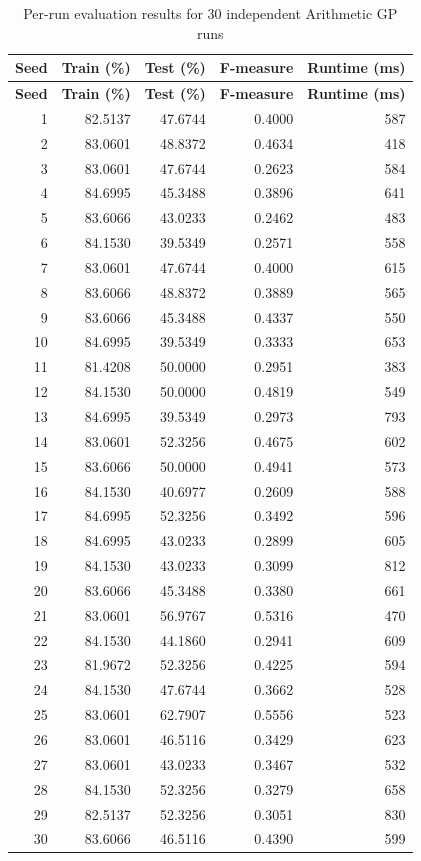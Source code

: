 \documentclass[12pt,a4paper]{article}
\begin{document}
\small
\begin{longtable}{rrrrr}
\caption{Per-run evaluation results for 30 independent Arithmetic GP runs}\label{tab:runresults}\\
\toprule
\textbf{Seed} & \textbf{Train (\%)} & \textbf{Test (\%)} & \textbf{F-measure} & \textbf{Runtime (ms)} \\
\midrule
\endfirsthead

\toprule
\textbf{Seed} & \textbf{Train (\%)} & \textbf{Test (\%)} & \textbf{F-measure} & \textbf{Runtime (ms)} \\
\midrule
\endhead

1  & 82.5137 & 47.6744 & 0.4000 & 587 \\
2  & 83.0601 & 48.8372 & 0.4634 & 418 \\
3  & 83.0601 & 47.6744 & 0.2623 & 584 \\
4  & 84.6995 & 45.3488 & 0.3896 & 641 \\
5  & 83.6066 & 43.0233 & 0.2462 & 483 \\
6  & 84.1530 & 39.5349 & 0.2571 & 558 \\
7  & 83.0601 & 47.6744 & 0.4000 & 615 \\
8  & 83.6066 & 48.8372 & 0.3889 & 565 \\
9  & 83.6066 & 45.3488 & 0.4337 & 550 \\
10 & 84.6995 & 39.5349 & 0.3333 & 653 \\
11 & 81.4208 & 50.0000 & 0.2951 & 383 \\
12 & 84.1530 & 50.0000 & 0.4819 & 549 \\
13 & 84.6995 & 39.5349 & 0.2973 & 793 \\
14 & 83.0601 & 52.3256 & 0.4675 & 602 \\
15 & 83.6066 & 50.0000 & 0.4941 & 573 \\
16 & 84.1530 & 40.6977 & 0.2609 & 588 \\
17 & 84.6995 & 52.3256 & 0.3492 & 596 \\
18 & 84.6995 & 43.0233 & 0.2899 & 605 \\
19 & 84.1530 & 43.0233 & 0.3099 & 812 \\
20 & 83.6066 & 45.3488 & 0.3380 & 661 \\
21 & 83.0601 & 56.9767 & 0.5316 & 470 \\
22 & 84.1530 & 44.1860 & 0.2941 & 609 \\
23 & 81.9672 & 52.3256 & 0.4225 & 594 \\
24 & 84.1530 & 47.6744 & 0.3662 & 528 \\
25 & 83.0601 & 62.7907 & 0.5556 & 523 \\
26 & 83.0601 & 46.5116 & 0.3429 & 623 \\
27 & 83.0601 & 43.0233 & 0.3467 & 532 \\
28 & 84.1530 & 52.3256 & 0.3279 & 658 \\
29 & 82.5137 & 52.3256 & 0.3051 & 830 \\
30 & 83.6066 & 46.5116 & 0.4390 & 599 \\
\bottomrule
\end{longtable}
\normalsize
\end{document}
